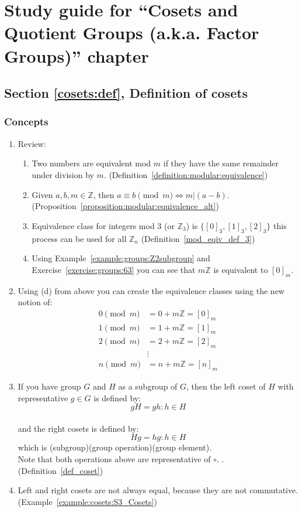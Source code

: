 \section{Study guide  for ``Cosets and Quotient Groups (a.k.a. Factor Groups)''  chapter}\label{sec:cosets:study} 


\subsection*{Section \ref{cosets:def}, Definition of cosets}
\subsubsection*{Concepts}
\begin{enumerate}
\item 
Review:
	\begin{enumerate}
	\item
	Two numbers are equivalent mod $m$ if they have the same remainder under division by $m$. (Definition~\ref{definition:modular:equivalence})
	\item
	Given $a, b, m \in {\mathbb Z}$, then $a \equiv b \pmod{m} \iff m | (a - b)$. (Proposition~\ref{proposition:modular:equivalence_alt})
	\item
	Equivalence class for integers mod 3 (or ${\mathbb Z}_3$) is $\{ [0]_3, [1]_3, [2]_3 \}$ this process can be used for all ${\mathbb Z}_n$ (Definition~\ref{mod_eqiv_def_3})
	\item
	Using Example~\ref{example:groups:Z2subgroup} and Exercise~\ref{exercise:groups:63} you can see that $m{\mathbb Z}$ is equivalent to  $[0]_m$.
	\end{enumerate}
	
\item
Using (d) from above you can create the equivalence classes using the new notion of:
	\begin{align*}
	0 \pmod{m} &= 0 + m{\mathbb Z} = [0]_m
	\\
	1 \pmod{m} &= 1 + m{\mathbb Z} = [1]_m
	\\
	2 \pmod{m} &= 2 + m{\mathbb Z} =  [2]_m
	\\
	&\vdots
	\\
	n \pmod{m} &= n + m{\mathbb Z} =  [n]_m
	\end{align*}

\item
If you have group $G$ and $H$ as a subgroup of $G$, then the left coset of $H$ with representative $g \in G$ is defined by:
\\
$$gH = {gh:h \in H}$$
\\
and the right cosets is defined by:
\\
$$Hg = {hg:h \in H}$$
which is (subgroup)(group operation)(group element).
\\
Note that both operations above are representative of $\circ$. . (Definition~\ref{def_coset})

\item
Left and right cosets are not always equal, because they are not commutative. (Example~\ref{example:cosets:S3_Cosets})
\end{enumerate}

